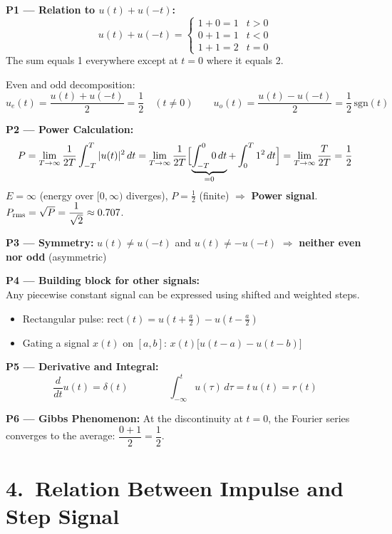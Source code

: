 \documentclass[10pt,a4paper]{article}
\newcommand{\Intt}{\displaystyle\int_{-\infty}^{t}}
\begin{document}
\begin{propbox}
\textbf{P1 --- Relation to $u(t)+u(-t)$:}
\[
  u(t)+u(-t)=\begin{cases}1+0=1 & t>0 \\ 0+1=1 & t<0 \\ 1+1=2 & t=0\end{cases}
\]
The sum equals 1 everywhere except at $t=0$ where it equals 2.

Even and odd decomposition:
\[
u_e(t) = \frac{u(t)+u(-t)}{2} = \frac{1}{2}\quad(t\neq0) \qquad u_o(t) = \frac{u(t)-u(-t)}{2} = \frac{1}{2}\,\text{sgn}(t)
\]

\medskip
\textbf{P2 --- Power Calculation:}
\[
  P = \lim_{T\to\infty}\frac{1}{2T}\int_{-T}^{T}|u(t)|^2\,dt
    = \lim_{T\to\infty}\frac{1}{2T}\Bigl[\underbrace{\int_{-T}^{0}0\,dt}_{=0}+\int_{0}^{T}1^2\,dt\Bigr]
    = \lim_{T\to\infty}\frac{T}{2T} = \frac{1}{2}
\]
$E = \infty$ (energy over $[0,\infty)$ diverges), $P = \tfrac{1}{2}$ (finite) $\Rightarrow$ \textbf{Power signal}. \quad $P_{\rm rms} = \sqrt{P} = \dfrac{1}{\sqrt{2}} \approx 0.707$.

\medskip
\textbf{P3 --- Symmetry:}
$u(t) \neq u(-t)$ and $u(t) \neq -u(-t)$ $\Rightarrow$ \textbf{neither even nor odd} (asymmetric)

\medskip
\textbf{P4 --- Building block for other signals:}\\
Any piecewise constant signal can be expressed using shifted and weighted steps.
\begin{itemize}
  \item Rectangular pulse: $\mathrm{rect}(t) = u(t+\tfrac{a}{2}) - u(t-\tfrac{a}{2})$
  \item Gating a signal $x(t)$ on $[a,b]$: $x(t)\bigl[u(t-a)-u(t-b)\bigr]$
\end{itemize}

\medskip
\textbf{P5 --- Derivative and Integral:}
\[
  \frac{d}{dt}u(t) = \delta(t) \qquad\qquad \Intt u(\tau)\,d\tau = t\,u(t) = r(t)
\]

\medskip
\textbf{P6 --- Gibbs Phenomenon:}
At the discontinuity at $t=0$, the Fourier series converges to the average: $\dfrac{0+1}{2}=\dfrac{1}{2}$.
\end{propbox}

\section{4.\ Relation Between Impulse and Step Signal}
\end{document}
